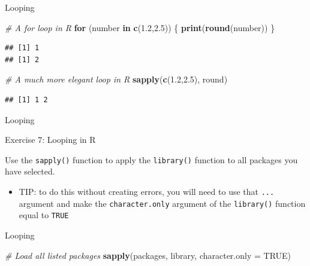 \documentclass[ignorenonframetext,]{beamer}
\newenvironment{Shaded}{\begin{snugshade}}{\end{snugshade}}
\newcommand{\KeywordTok}[1]{\textcolor[rgb]{0.13,0.29,0.53}{\textbf{#1}}}
\newcommand{\DataTypeTok}[1]{\textcolor[rgb]{0.13,0.29,0.53}{#1}}
\newcommand{\FloatTok}[1]{\textcolor[rgb]{0.00,0.00,0.81}{#1}}
\newcommand{\CommentTok}[1]{\textcolor[rgb]{0.56,0.35,0.01}{\textit{#1}}}
\newcommand{\OtherTok}[1]{\textcolor[rgb]{0.56,0.35,0.01}{#1}}
\newcommand{\ControlFlowTok}[1]{\textcolor[rgb]{0.13,0.29,0.53}{\textbf{#1}}}
\newcommand{\NormalTok}[1]{#1}
\providecommand{\tightlist}{%
  \setlength{\itemsep}{0pt}\setlength{\parskip}{0pt}}
\begin{document}
\begin{frame}[fragile]{Looping}

\begin{Shaded}
\begin{Highlighting}[]
    \CommentTok{# A for loop in R}
    \ControlFlowTok{for}\NormalTok{ (number }\ControlFlowTok{in} \KeywordTok{c}\NormalTok{(}\FloatTok{1.2}\NormalTok{,}\FloatTok{2.5}\NormalTok{)) \{}
      \KeywordTok{print}\NormalTok{(}\KeywordTok{round}\NormalTok{(number))}
\NormalTok{    \}}
\end{Highlighting}
\end{Shaded}

\begin{verbatim}
## [1] 1
## [1] 2
\end{verbatim}

\begin{Shaded}
\begin{Highlighting}[]
    \CommentTok{# A much more elegant loop in R}
    \KeywordTok{sapply}\NormalTok{(}\KeywordTok{c}\NormalTok{(}\FloatTok{1.2}\NormalTok{,}\FloatTok{2.5}\NormalTok{), round)}
\end{Highlighting}
\end{Shaded}

\begin{verbatim}
## [1] 1 2
\end{verbatim}

\end{frame}

\begin{frame}[fragile]{Looping}

\begin{block}{Exercise 7: Looping in R}

Use the \texttt{sapply()} function to apply the \texttt{library()}
function to all packages you have selected.

\begin{itemize}
\tightlist
\item
  TIP: to do this without creating errors, you will need to use that
  \texttt{...} argument and make the \texttt{character.only} argument of
  the \texttt{library()} function equal to \texttt{TRUE}
\end{itemize}

\end{block}

\end{frame}

\begin{frame}[fragile]{Looping}

\begin{Shaded}
\begin{Highlighting}[]
    \CommentTok{# Load all listed packages}
    \KeywordTok{sapply}\NormalTok{(packages, library, }\DataTypeTok{character.only =} \OtherTok{TRUE}\NormalTok{)}
\end{Highlighting}
\end{Shaded}

\end{frame}
\end{document}
